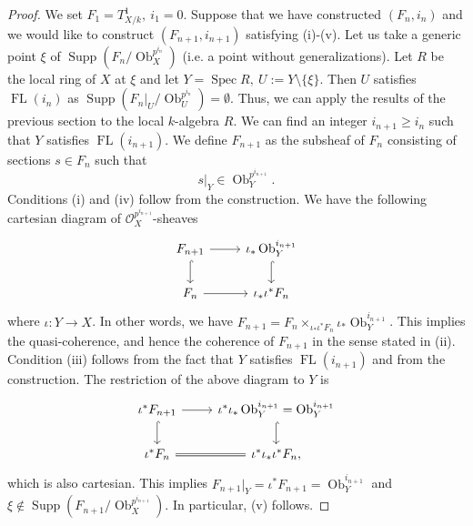 \documentclass{amsart}
\newcommand{\FL}[1]{\operatorname{FL}(#1)}
\begin{document}
\begin{proof}
    We set $F_1=T_{X/k}^1,\ i_1=0$. Suppose that we have constructed $(F_n, i_n)$ and we would like to construct $(F_{n+1},i_{n+1})$ satisfying (i)-(v). Let us take a generic point $\xi$ of $\operatorname{Supp}(F_n/\operatorname{Ob}_X^{p^{i_n}})$ (i.e. a point without generalizations). Let $R$ be the local ring of $X$ at $\xi$ and let $Y=\operatorname{Spec}R,\ U:=Y\setminus \{\xi\}$. Then $U$ satisfies $\FL{i_n}$ as $\operatorname{Supp}(F_n|_U/\operatorname{Ob}_U^{p^{i_n}})=\emptyset$. Thus, we can apply the results of the previous section to the local $k$-algebra $R$. We can find an integer $i_{n+1}\ge i_{n}$ such that $Y$ satisfies $\FL{i_{n+1}}$. We define $F_{n+1}$ as the subsheaf of $F_n$ consisting of sections $s\in F_n$ such that $$s|_Y\in \operatorname{Ob}_Y^{p^{i_{n+1}}}.$$
    Conditions (i) and (iv) follow from the construction. We have the following cartesian diagram of $\mathcal{O}_X^{p^{i_{n+1}}}$-sheaves
\[\begin{tikzcd}
	{F_{n+1}} & {\iota_*\operatorname{Ob}_Y^{i_{n+1}}} \\
	{F_n} & {\iota_*\iota^*F_n}
	\arrow[from=1-1, to=1-2]
	\arrow[hook, from=1-1, to=2-1]
	\arrow[hook, from=1-2, to=2-2]
	\arrow[from=2-1, to=2-2]
\end{tikzcd}\]
    where $\iota: Y\to X$. In other words, we have $F_{n+1}=F_n\times_{\iota_*\iota^*F_n}\iota_*\operatorname{Ob}_Y^{i_{n+1}}$. This implies the quasi-coherence, and hence the coherence of $F_{n+1}$ in the sense stated in (ii). Condition (iii) follows from the fact that $Y$ satisfies $\FL{i_{n+1}}$ and from the construction. The restriction of the above diagram to $Y$ is
\[\begin{tikzcd}
	{\iota^*F_{n+1}} & {\iota^*\iota_*\operatorname{Ob}_Y^{i_{n+1}}=\operatorname{Ob}_Y^{i_{n+1}}} \\
	{\iota^*F_n} & {\iota^*\iota_*\iota^*F_n}
	\arrow[from=1-1, to=1-2]
	\arrow[hook, from=1-1, to=2-1]
	\arrow[hook, from=1-2, to=2-2]
	\arrow[equals, from=2-1, to=2-2],
\end{tikzcd}\]
    which is also cartesian. This implies $F_{n+1}|_Y=\iota^*F_{n+1}=\operatorname{Ob}_Y^{i_{n+1}}$ and $\xi \notin \operatorname{Supp}(F_{n+1}/\operatorname{Ob}_X^{p^{i_{n+1}}})$. In particular, (v) follows.
\end{proof}
\end{document}
